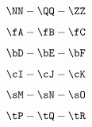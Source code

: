 \documentclass[varwidth, border = 3pt]{standalone}
\begin{document}
$\NN - \QQ - \ZZ$

$\fA - \fB - \fC$

$\bD - \bE - \bF$

$\cI - \cJ - \cK$

$\sM - \sN - \sO$

$\tP - \tQ - \tR$
\end{document}
